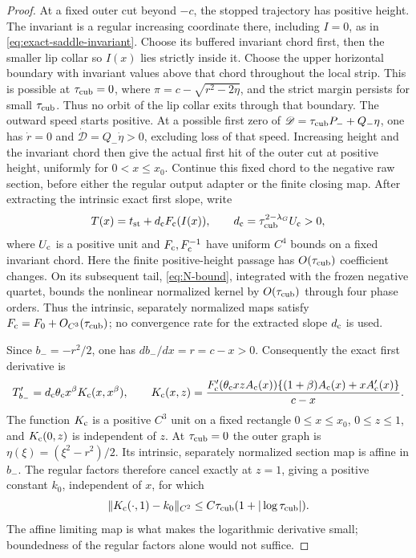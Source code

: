\begin{proof}
At a fixed outer cut beyond \(-c\), the stopped trajectory has
positive height. The invariant is a regular increasing coordinate
there, including \(I=0\), as in
\eqref{eq:exact-saddle-invariant}. Choose its buffered invariant chord
first, then the smaller lip collar so \(I(x)\) lies strictly inside it.
Choose the upper horizontal boundary with invariant values above that
chord throughout the local strip. This is possible at \(\tau_{\rm cub}=0\),
where \(\pi=c-\sqrt{r^2-2\eta}\), and the strict margin persists
for small \(\tau_{\rm cub}\). Thus no orbit of the lip collar exits through
that boundary.
The outward speed starts positive. At a possible first zero of
\(\mathscr D=\tau_{\rm cub} P_-+Q_-\eta\), one has
\(\dot r=0\) and \(\dot{\mathscr D}=Q_-\dot\eta>0\), excluding
loss of that speed. Increasing height and the invariant chord then give
the actual first hit of the outer cut at positive height, uniformly for
\(0<x\le x_0\). Continue this fixed chord to the
negative raw section, before either the regular output adapter or the
finite closing map. After extracting the intrinsic exact first slope, write
\[
 T(x)=t_{\rm st}+d_{\rm c} F_{\rm c}(I(x)),\qquad
 d_{\rm c}=\tau_{\rm cub}^{2-\lambda_G}U_{\rm c}>0,
\]
where \(U_{\rm c}\) is a positive unit and \(F_{\rm c},F_{\rm c}^{-1}\)
have uniform \(C^4\) bounds on a fixed invariant chord. Here the
finite positive-height passage has \(O(\tau_{\rm cub})\) coefficient changes.
On its subsequent tail, \eqref{eq:N-bound}, integrated with the
frozen negative quartet, bounds the nonlinear normalized kernel by
\(O(\tau_{\rm cub})\) through four phase orders. Thus the intrinsic,
separately normalized maps
satisfy \(F_{\rm c}=F_0+O_{C^3}(\tau_{\rm cub})\); no convergence rate for
the extracted slope \(d_{\rm c}\) is used.

Since \(b_-=-r^2/2\), one has \(db_-/dx=r=c-x>0\).
Consequently the exact first derivative is
\[
 T_{b_-}'=d_{\rm c}\theta_{\rm c} x^\beta
                 K_{\rm c}(x,x^\beta),\qquad
 K_{\rm c}(x,z)=
 \frac{F_{\rm c}'(\theta_{\rm c} xzA_{\rm c}(x))
       \{(1+\beta)A_{\rm c}(x)+xA_{\rm c}'(x)\}}{c-x}.
\]
The function \(K_{\rm c}\) is a positive \(C^3\) unit on a fixed
rectangle \(0\le x\le x_0\), \(0\le z\le1\), and
\(K_{\rm c}(0,z)\) is independent of \(z\).
At \(\tau_{\rm cub}=0\) the outer graph is
\(\eta(\xi)=(\xi^2-r^2)/2\). Its intrinsic, separately
normalized section map is affine in \(b_-\). The regular factors
therefore cancel exactly at \(z=1\), giving a positive constant
\(k_0\), independent of \(x\), for which
\[
 \|K_{\rm c}(\cdot,1)-k_0\|_{C^2}
       \le C\tau_{\rm cub}(1+|\log\tau_{\rm cub}|).
\]
The affine limiting map is what makes the logarithmic derivative small;
boundedness of the regular factors alone would not suffice.


\end{proof}
